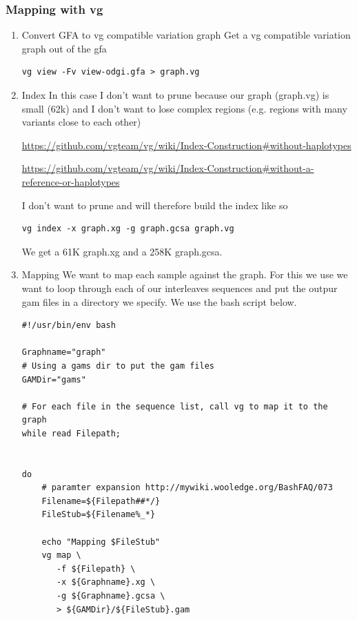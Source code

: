 \documentclass[a4paper]{article}
\begin{document}
\subsubsection{Mapping with vg}
\label{sec:org1984be4}
\begin{enumerate}
\item Convert GFA to vg compatible variation graph
\label{sec:orgcc91f43}
Get a vg compatible variation graph out of the gfa

\begin{verbatim}
vg view -Fv view-odgi.gfa > graph.vg
\end{verbatim}

\item Index
\label{sec:org6454df1}
In this case I don’t want to prune because our graph (graph.vg)  is small (62k) 
and I don’t want to lose complex regions 
(e.g. regions with many variants close to each other)

\url{https://github.com/vgteam/vg/wiki/Index-Construction\#without-haplotypes}

\url{https://github.com/vgteam/vg/wiki/Index-Construction\#without-a-reference-or-haplotypes}

I don’t want to prune and will therefore build the index like so

\begin{verbatim}
vg index -x graph.xg -g graph.gcsa graph.vg
\end{verbatim}

We get a 61K graph.xg and a 258K graph.gcsa.
\item Mapping
\label{sec:orgcb5d5ac}
We want to map each sample against the graph.
For this we use we want to loop through each of our interleaves sequences
and put the outpur gam files in a directory we specify.
We use the bash script below.

\begin{verbatim}
#!/usr/bin/env bash

Graphname="graph"
# Using a gams dir to put the gam files
GAMDir="gams"

# For each file in the sequence list, call vg to map it to the graph
while read Filepath;


do
    # paramter expansion http://mywiki.wooledge.org/BashFAQ/073
    Filename=${Filepath##*/}
    FileStub=${Filename%_*}

    echo "Mapping $FileStub"
    vg map \
       -f ${Filepath} \
       -x ${Graphname}.xg \
       -g ${Graphname}.gcsa \
       > ${GAMDir}/${FileStub}.gam
\end{verbatim}


\end{enumerate}
\end{document}
